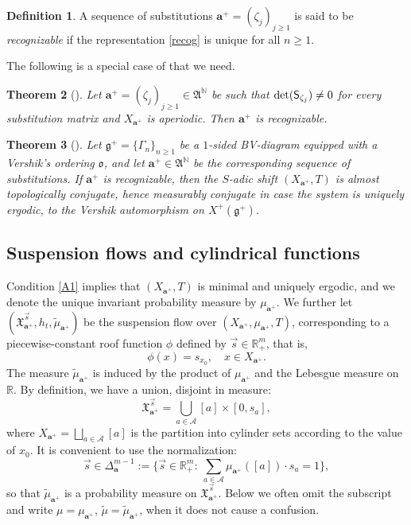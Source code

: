 \documentclass[JEP,XML,SOM,Unicode]{cedram}
\let\mathcal\mathscr
\theoremstyle{plain}
\newtheorem{theorem}{Theorem}[section]
\theoremstyle{definition}
\newtheorem{defi}[theorem]{Definition}
\let\wt\widetilde
\newcommand\bom{{\boldsymbol a}}\let\ba\bom
\let\Gam\Gamma
\newcommand\gf{\mathfrak{g}}
\newcommand\ok{\mathfrak{o}}
\newcommand\FrA{\mathfrak{A}}
\newcommand\Xx{\mathfrak{X}}
\newcommand\Ak{\mathcal{A}}
\newcommand{\R}{\mathbb{R}}
\newcommand{\N}{\mathbb{N}}
\newcommand\Sf{{\sf S}}
\begin{document}
\begin{defi} \label{def-recog}
A sequence of substitutions $\ba^+ = (\zeta_j)_{j\ge 1}$ is said to be \emph{recognizable} if the representation \eqref{recog} is unique for all $n\ge 1$.
\end{defi}

The following is a special case of \cite[Th.\,4.6]{BSTY} that we need.

\begin{theorem}[{\cite{BSTY}}] \label{th-recog0}
Let $\ba^+= (\zeta_j)_{j\ge 1} \in \FrA^\N$ be such that $\det(\Sf_{\zeta_j})\ne 0$ for every substitution matrix and $X_{\ba^+}$ is aperiodic. Then $\ba^+$ is recognizable.
\end{theorem}

\begin{theorem}[{\cite[Th.\,6.5]{BSTY}}] \label{thm-recog}
Let $\gf^+=\{\Gam_n\}_{n\ge 1}$ be a $1$-sided BV-diagram equipped with a Vershik's ordering $\ok$, and let $\ba^+\in \FrA^\N$ be the corresponding sequence of substitutions.
If $\ba^+$ is recognizable, then the $S$-adic shift $(X_{\ba^+},T)$ is almost topologically conjugate, hence measurably conjugate in case the system is uniquely ergodic, to the
Vershik automorphism on $X^+(\gf^+)$.
\end{theorem}

\subsection{Suspension flows and cylindrical functions}
Condition \eqref{A1} implies that $(X_{\ba^+},T)$ is minimal and uniquely ergodic, and we
denote the unique invariant probability measure by $\mu_{\bom^+}$.
We further let
$(\Xx_{\ba^+}^{\vec{s}}, h_t, \wt{\mu}_{\bom^+})$ be the suspension flow over $(X_{\ba^+},\mu_{\bom^+}, T)$, corresponding to a piecewise-constant roof function $\phi$ defined by \hbox{$\vec{s}\in \R^m_+$}, that is,
\[
\phi(x) = s_{x_0},\quad x\in X_{\ba^+}.
\]
The measure $\wt\mu_{\bom^+}$ is induced by the product of $\mu_{\bom^+}$ and the Lebesgue measure on $\R$.
By definition, we have a union, disjoint in measure:
\[
\Xx_{\ba^+}^{\vec{s}} = \bigcup_{a\in \Ak} [a]\times [0,s_a],
\]
where $X_{\ba^+} = \bigsqcup_{a\in \Ak} [a] $ is the partition into cylinder sets according to the value of $x_0$. It is convenient to use the normalization:
\[\textstyle
\vec{s} \in \Delta^{m-1}_\bom:= \bigl\{\vec s\in \R^m_+: \ \sum_{a\in \Ak} \mu_{\bom^+}([a]) \cdot s_a = 1\bigr\},
\]
so that $\wt \mu_{\bom^+}$ is a probability measure on $\Xx_{\ba^+}^{\vec{s}}$. Below we often omit the subscript and write $\mu = \mu_{\bom^+}$, $\wt\mu = \wt\mu_{\bom^+}$,
when it does not cause a confusion.
\end{document}
